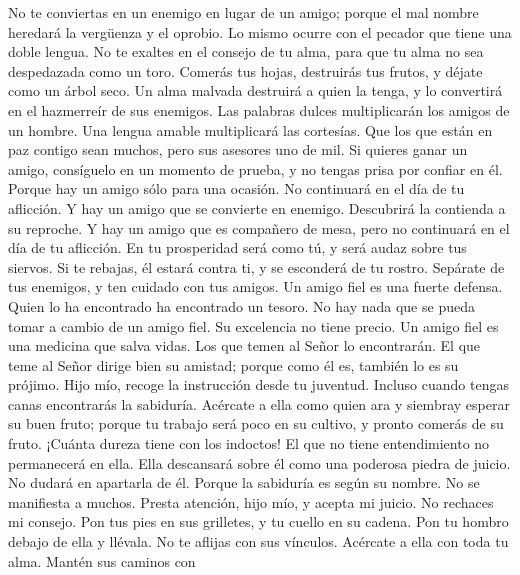  No te conviertas en un enemigo en lugar de un amigo;
porque el mal nombre heredará la vergüenza y el oprobio. Lo mismo ocurre
con el pecador que tiene una doble lengua.  No te exaltes
en el consejo de tu alma, para que tu alma no sea despedazada como un
toro.  Comerás tus hojas, destruirás tus frutos, y déjate
como un árbol seco.  Un alma malvada destruirá a quien la
tenga, y lo convertirá en el hazmerreír de sus enemigos. 
Las palabras dulces multiplicarán los amigos de un hombre. Una lengua
amable multiplicará las cortesías.  Que los que están en
paz contigo sean muchos, pero sus asesores uno de mil.  Si
quieres ganar un amigo, consíguelo en un momento de prueba, y no tengas
prisa por confiar en él.  Porque hay un amigo sólo para
una ocasión. No continuará en el día de tu aflicción.  Y
hay un amigo que se convierte en enemigo. Descubrirá la contienda a su
reproche.  Y hay un amigo que es compañero de mesa, pero
no continuará en el día de tu aflicción.  En tu
prosperidad será como tú, y será audaz sobre tus siervos.
 Si te rebajas, él estará contra ti, y se esconderá de tu
rostro.  Sepárate de tus enemigos, y ten cuidado con tus
amigos.  Un amigo fiel es una fuerte defensa. Quien lo ha
encontrado ha encontrado un tesoro.  No hay nada que se
pueda tomar a cambio de un amigo fiel. Su excelencia no tiene precio.
 Un amigo fiel es una medicina que salva vidas. Los que
temen al Señor lo encontrarán.  El que teme al Señor
dirige bien su amistad; porque como él es, también lo es su prójimo.
 Hijo mío, recoge la instrucción desde tu juventud.
Incluso cuando tengas canas encontrarás la sabiduría. 
Acércate a ella como quien ara y siembray esperar su buen fruto; porque
tu trabajo será poco en su cultivo, y pronto comerás de su fruto.
 ¡Cuánta dureza tiene con los indoctos! El que no tiene
entendimiento no permanecerá en ella.  Ella descansará
sobre él como una poderosa piedra de juicio. No dudará en apartarla de
él.  Porque la sabiduría es según su nombre. No se
manifiesta a muchos.  Presta atención, hijo mío, y acepta
mi juicio. No rechaces mi consejo.  Pon tus pies en sus
grilletes, y tu cuello en su cadena.  Pon tu hombro
debajo de ella y llévala. No te aflijas con sus vínculos.
 Acércate a ella con toda tu alma. Mantén sus caminos con
